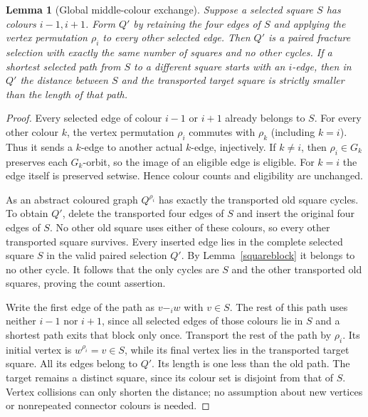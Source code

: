 \documentclass[11pt,a4paper]{article}
\newtheorem{lemma}[theorem]{Lemma}
\begin{document}
\begin{lemma}[Global middle-colour exchange]\label{global}
Suppose a selected square $S$ has colours $i-1,i+1$. Form $Q'$ by
retaining the four edges of $S$ and applying the vertex permutation
$\rho_i$ to every other selected edge. Then $Q'$ is a paired fracture
selection with exactly the same number of squares and no other cycles.
If a shortest selected path from $S$ to a different square starts with
an $i$-edge, then in $Q'$ the distance between $S$ and the transported
target square is strictly smaller than the length of that path.
\end{lemma}
\begin{proof}
Every selected edge of colour $i-1$ or $i+1$ already belongs to $S$.
For every other colour $k$, the vertex permutation $\rho_i$ commutes
with $\rho_k$ (including $k=i$). Thus it sends a $k$-edge to another
actual $k$-edge, injectively. If $k\ne i$, then $\rho_i\in G_k$
preserves each $G_k$-orbit, so the image of an eligible edge is eligible.
For $k=i$ the edge itself is preserved setwise. Hence colour counts
and eligibility are unchanged.

As an abstract coloured graph $Q^{\rho_i}$ has exactly the transported
old square cycles. To obtain $Q'$, delete the transported four edges
of $S$ and insert the original four edges of $S$. No other old square
uses either of these colours, so every other transported square
survives. Every inserted edge lies in the complete selected square
$S$ in the valid paired selection $Q'$. By Lemma~\ref{squareblock}
it belongs to no other cycle. It follows that the only cycles are
$S$ and the other transported old squares, proving the count assertion.

Write the first edge of the path as $v\mathrel{-_i}w$ with $v\in S$.
The rest of this path uses neither $i-1$ nor $i+1$, since all selected
edges of those colours lie in $S$ and a shortest path exits that block
only once. Transport the rest of the path by $\rho_i$. Its initial
vertex is $w^{\rho_i}=v\in S$, while its final vertex lies in the
transported target square. All its edges belong to $Q'$. Its length
is one less than the old path. The target remains a distinct square,
since its colour set is disjoint from that of $S$. Vertex collisions
can only shorten the distance; no assumption about new vertices or
nonrepeated connector colours is needed.
\end{proof}
\end{document}
